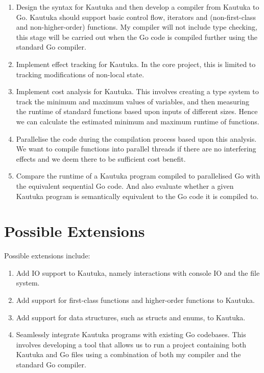\documentclass[12pt,a4paper,twoside]{article}
\begin{document}
\begin{enumerate}
  \item Design the syntax for Kautuka and then develop a compiler from Kautuka to Go. Kautuka should support basic control flow, iterators and (non-first-class and non-higher-order) functions. My compiler will not include type checking, this stage will be carried out when the Go code is compiled further using the standard Go compiler.
  \item Implement effect tracking for Kautuka. In the core project, this is limited to tracking modifications of non-local state. 
  \item Implement cost analysis for Kautuka. This involves creating a type system to track the minimum and maximum values of variables, and then measuring the runtime of standard functions based upon inputs of different sizes. Hence we can calculate the estimated minimum and maximum runtime of functions. 
  \item Parallelise the code during the compilation process based upon this analysis. We want to compile functions into parallel threads if there are no interfering effects and we deem there to be sufficient cost benefit.
  \item Compare the runtime of a Kautuka program compiled to parallelised Go with the equivalent sequential Go code. And also evaluate whether a given Kautuka program is semantically equivalent to the Go code it is compiled to. 
\end{enumerate}

\section{Possible Extensions}

Possible extensions include: 

\begin{enumerate}
  \item Add IO support to Kautuka, namely interactions with console IO and the file system.
  \item Add support for first-class functions and higher-order functions to Kautuka.
  \item Add support for data structures, such as structs and enums, to Kautuka.
  \item Seamlessly integrate Kautuka programs with existing Go codebases. This involves developing a tool that allows us to run a project containing both Kautuka and Go files using a combination of both my compiler and the standard Go compiler.
\end{enumerate}
\end{document}
